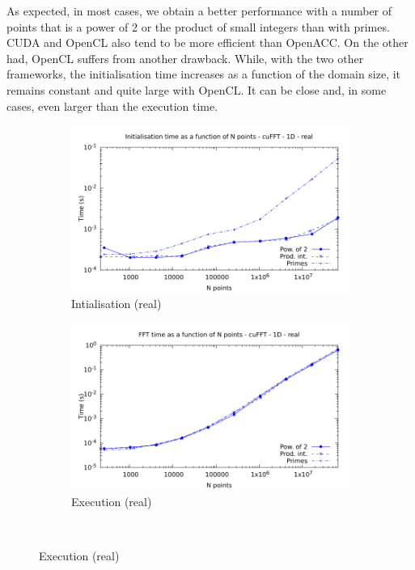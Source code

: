 \documentclass[12pt, a4paper]{article}
\begin{document}
As expected, in most cases, we obtain a better performance with a number of points that is a power of 2 or the product of small integers than with primes. CUDA and OpenCL also tend to be more efficient than OpenACC. On the other had, OpenCL suffers from another drawback. While, with the two other frameworks, the initialisation time increases as a function of the domain size, it remains constant and quite large with OpenCL. It can be close and, in some cases, even larger than the execution time.
  
\begin{figure}[H]
\captionsetup{width=0.8\linewidth}
\centering
\begin{subfigure}{.5\textwidth}
\centering
\includegraphics[width=.9\linewidth]{graphs/fft-cuda-1d-pow2-r-init.pdf}
\caption{Intialisation (real)}
\label{FFTCUDA1DRI}
\end{subfigure}%
\begin{subfigure}{.5\textwidth}
\centering
\includegraphics[width=.9\linewidth]{graphs/fft-cuda-1d-pow2-r-exec.pdf}
\caption{Execution (real)}
\label{FFTCUDA1DRE}
\end{subfigure}\\

\end{figure}
\end{document}
